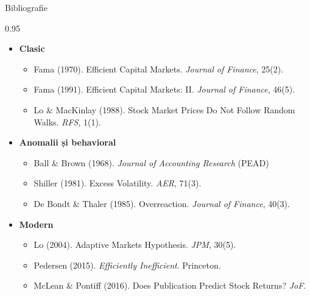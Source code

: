 \documentclass[9pt, aspectratio=169, t]{beamer}
\begin{document}
\begin{frame}[shrink=15]{Bibliografie}
\begin{cminipage}{0.95\textwidth}
\begin{itemize}\setlength{\itemsep}{0pt}
    \item \textbf{Clasic}
    \begin{itemize}\setlength{\itemsep}{0pt}
        \item Fama (1970). Efficient Capital Markets. \textit{Journal of Finance}, 25(2).
        \item Fama (1991). Efficient Capital Markets: II. \textit{Journal of Finance}, 46(5).
        \item Lo \& MacKinlay (1988). Stock Market Prices Do Not Follow Random Walks. \textit{RFS}, 1(1).
    \end{itemize}
    \item \textbf{Anomalii și behavioral}
    \begin{itemize}\setlength{\itemsep}{0pt}
        \item Ball \& Brown (1968). \textit{Journal of Accounting Research} (PEAD)
        \item Shiller (1981). Excess Volatility. \textit{AER}, 71(3).
        \item De Bondt \& Thaler (1985). Overreaction. \textit{Journal of Finance}, 40(3).
    \end{itemize}
    \item \textbf{Modern}
    \begin{itemize}\setlength{\itemsep}{0pt}
        \item Lo (2004). Adaptive Markets Hypothesis. \textit{JPM}, 30(5).
        \item Pedersen (2015). \textit{Efficiently Inefficient}. Princeton.
        \item McLean \& Pontiff (2016). Does Publication Predict Stock Returns? \textit{JoF}.
    \end{itemize}
\end{itemize}
\end{cminipage}
\end{frame}
\end{document}
